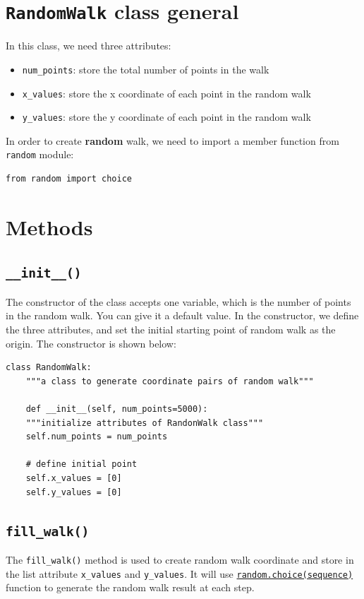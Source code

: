 \documentclass[12pt]{book}
\begin{document}
\section{\texttt{RandomWalk} class general}
\label{sec:org08d9c44}
In this class, we need three attributes:
\begin{itemize}
\item \texttt{num\_points}: store the total number of points in the walk
\item \texttt{x\_values}: store the x coordinate of each point in the random walk
\item \texttt{y\_values}: store the y coordinate of each point in the random walk
\end{itemize}

In order to create \textbf{random} walk, we need to import a member function from \texttt{random} module:
\begin{verbatim}
from random import choice
\end{verbatim}

\section{Methods}
\label{sec:org33b6a36}
\subsection{\texttt{\_\_init\_\_()}}
\label{sec:orgb5a71c8}
The constructor of the class accepts one variable, which is the number of points in the random walk. You can give it a default value. In the constructor, we define the three attributes, and set the initial starting point of random walk as the origin. The constructor is shown below:
\begin{verbatim}
class RandomWalk:
    """a class to generate coordinate pairs of random walk"""

    def __init__(self, num_points=5000):
	"""initialize attributes of RandonWalk class"""
	self.num_points = num_points

	# define initial point
	self.x_values = [0]
	self.y_values = [0]
\end{verbatim}

\subsection{\texttt{fill\_walk()}}
\label{sec:orgea154c5}
The \texttt{fill\_walk()} method is used to create random walk coordinate and store in the list attribute \texttt{x\_values} and \texttt{y\_values}. It will use \hyperref[org653213f]{\texttt{random.choice(sequence)}} function to generate the random walk result at each step.
\end{document}

